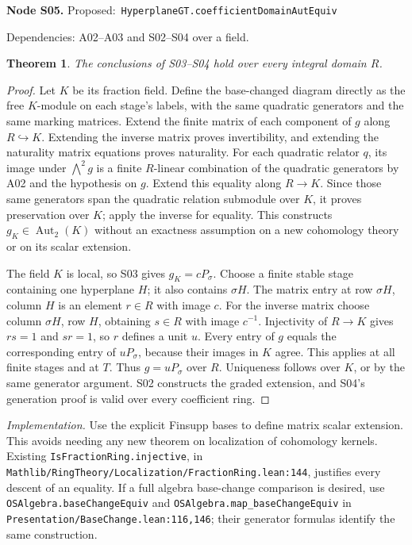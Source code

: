 \documentclass[11pt]{article}
\newtheorem{theorem}{Theorem}[section]
\theoremstyle{remark}\newtheorem{remark}[theorem]{Remark}
\newcommand{\Aut}{\operatorname{Aut}}
\newcommand{\code}[1]{\nolinkurl{#1}}
\newcommand{\node}[3]{\par\Needspace{8\baselineskip}\smallskip\noindent\textbf{Node #1.}\quad
 \textsf{Proposed:}\ \code{#2}\par\noindent
 \textsf{Dependencies:} #3.\par\smallskip}
\begin{document}
\node{S05}{HyperplaneGT.coefficientDomainAutEquiv}{A02--A03 and S02--S04 over a field}
\begin{theorem}\label{thm:s05}
The conclusions of S03--S04 hold over every integral domain $R$.
\end{theorem}
\begin{proof}
Let $K$ be its fraction field. Define the base-changed diagram
directly as the free $K$-module on each stage's labels, with the
same quadratic generators and the same marking matrices.
Extend the finite matrix of each component of $g$ along
$R\hookrightarrow K$. Extending the inverse matrix proves
invertibility, and extending the naturality matrix equations
proves naturality. For each quadratic relator $q$, its image
under $\bigwedge^2g$ is a finite $R$-linear combination of the
quadratic generators by A02 and the hypothesis on $g$. Extend
this equality along $R\to K$. Since those same generators
span the quadratic relation submodule over $K$, it proves
preservation over $K$; apply the inverse for equality. This
constructs $g_K\in\Aut_2(K)$ without an exactness assumption
on a new cohomology theory or on its scalar extension.

The field $K$ is local, so S03 gives $g_K=cP_\sigma$.
Choose a finite stable stage containing one hyperplane $H$;
it also contains $\sigma H$. The matrix entry at row
$\sigma H$, column $H$ is an element $r\in R$ with image
$c$. For the inverse matrix choose column $\sigma H$, row
$H$, obtaining $s\in R$ with image $c^{-1}$. Injectivity of
$R\to K$ gives $rs=1$ and $sr=1$, so $r$ defines a unit $u$.
Every entry of $g$ equals the corresponding entry of
$uP_\sigma$, because their images in $K$ agree. This applies
at all finite stages and at $T$. Thus $g=uP_\sigma$ over $R$.
Uniqueness follows over $K$, or by the same generator argument.
S02 constructs the graded extension, and S04's generation proof
is valid over every coefficient ring.
\end{proof}
\emph{Implementation.} Use the explicit Finsupp bases to define
matrix scalar extension. This avoids needing any new theorem on
localization of cohomology kernels. Existing
\code{IsFractionRing.injective}, in
\code{Mathlib/RingTheory/Localization/FractionRing.lean:144},
justifies every descent of an equality. If a full algebra base-change
comparison is desired, use \code{OSAlgebra.baseChangeEquiv} and
\code{OSAlgebra.map_baseChangeEquiv} in
\code{Presentation/BaseChange.lean:116,146}; their generator
formulas identify the same construction.

\end{document}
